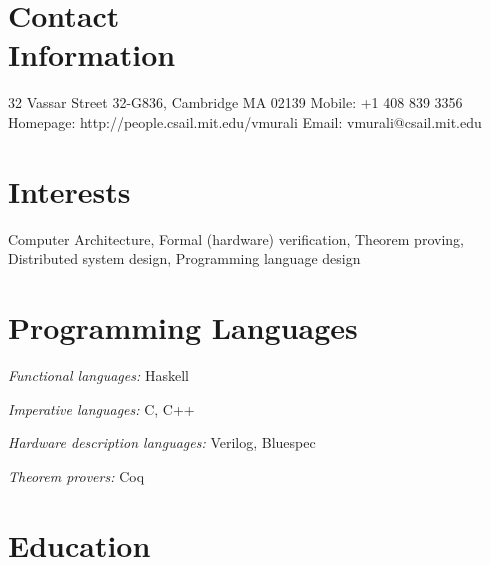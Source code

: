 \documentclass[margin,line]{resume}
\begin{document}
\begin{resume}

    \section{\mysidestyle Contact\\Information}

    32 Vassar Street 32-G836, Cambridge MA 02139   \hfill Mobile: +1 408 839 3356          \\
    Homepage: http://people.csail.mit.edu/vmurali     \hfill Email: vmurali@csail.mit.edu    \\

    \vspace{-7mm}
    \section{\mysidestyle Interests}

    Computer Architecture, Formal (hardware) verification, Theorem proving, Distributed system design, Programming language design\\

    \vspace{-3mm}

    \section{\mysidestyle Programming Languages}
    \begin{list2}
    \item \emph{Functional languages:} Haskell
    \item \emph{Imperative languages:} C, C++
    \item \emph{Hardware description languages:} Verilog, Bluespec
    \item \emph{Theorem provers:} Coq
    \end{list2}

    \section{\mysidestyle Education}


\end{resume}
\end{document}
